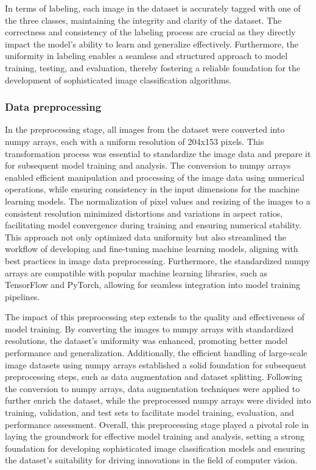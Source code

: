 \documentclass{article}
\begin{document}
            In terms of labeling, each image in the dataset is accurately tagged with one of the three classes, maintaining the integrity and clarity of the dataset. The correctness and consistency of the labeling process are crucial as they directly impact the model's ability to learn and generalize effectively. Furthermore, the uniformity in labeling enables a seamless and structured approach to model training, testing, and evaluation, thereby fostering a reliable foundation for the development of sophisticated image classification algorithms.

        \subsubsection{Data preprocessing}
            In the preprocessing stage, all images from the dataset were converted into numpy arrays, each with a uniform resolution of 204x153 pixels. This transformation process was essential to standardize the image data and prepare it for subsequent model training and analysis. The conversion to numpy arrays enabled efficient manipulation and processing of the image data using numerical operations, while ensuring consistency in the input dimensions for the machine learning models. The normalization of pixel values and resizing of the images to a consistent resolution minimized distortions and variations in aspect ratios, facilitating model convergence during training and ensuring numerical stability. This approach not only optimized data uniformity but also streamlined the workflow of developing and fine-tuning machine learning models, aligning with best practices in image data preprocessing. Furthermore, the standardized numpy arrays are compatible with popular machine learning libraries, such as TensorFlow and PyTorch, allowing for seamless integration into model training pipelines.
            
            The impact of this preprocessing step extends to the quality and effectiveness of model training. By converting the images to numpy arrays with standardized resolutions, the dataset's uniformity was enhanced, promoting better model performance and generalization. Additionally, the efficient handling of large-scale image datasets using numpy arrays established a solid foundation for subsequent preprocessing steps, such as data augmentation and dataset splitting. Following the conversion to numpy arrays, data augmentation techniques were applied to further enrich the dataset, while the preprocessed numpy arrays were divided into training, validation, and test sets to facilitate model training, evaluation, and performance assessment. Overall, this preprocessing stage played a pivotal role in laying the groundwork for effective model training and analysis, setting a strong foundation for developing sophisticated image classification models and ensuring the dataset's suitability for driving innovations in the field of computer vision.
    
\end{document}
